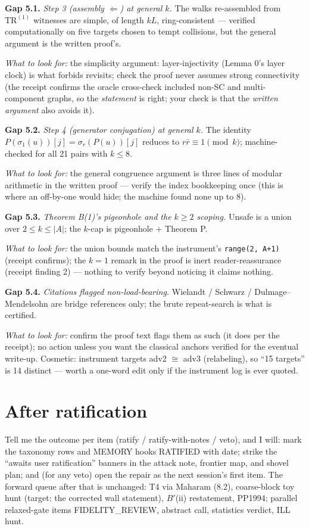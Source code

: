 \documentclass[11pt]{article}
\newcommand{\gap}[1]{\medskip\noindent\textbf{Gap #1.}}
\newcommand{\lookfor}{\par\smallskip\noindent\emph{What to look for:} }
\begin{document}
\gap{5.1} \emph{Step 3 (assembly $\Leftarrow$) at general $k$.} The
walks re-assembled from $\mathrm{TR}^{(1)}$ witnesses are simple, of
length $kL$, ring-consistent --- verified computationally on five
targets chosen to tempt collisions, but the general argument is the
written proof's.
\lookfor the simplicity argument: layer-injectivity (Lemma 0's layer
clock) is what forbids revisits; check the proof never assumes strong
connectivity (the receipt confirms the oracle cross-check included
non-SC and multi-component graphs, so the \emph{statement} is right;
your check is that the \emph{written argument} also avoids it).

\gap{5.2} \emph{Step 4 (generator conjugation) at general $k$.} The
identity $P(\sigma_1(u))[j] = \sigma_r(P(u))[j]$ reduces to $r \bar r
\equiv 1 \pmod k$; machine-checked for all 21 pairs with $k \le 8$.
\lookfor the general congruence argument is three lines of modular
arithmetic in the written proof --- verify the index bookkeeping once
(this is where an off-by-one would hide; the machine found none up to
8).

\gap{5.3} \emph{Theorem B(1)'s pigeonhole and the $k \ge 2$ scoping.}
Unsafe is a union over $2 \le k \le |A|$; the $k$-cap is pigeonhole
$+$ Theorem P.
\lookfor the union bounds match the instrument's
\texttt{range(2, A+1)} (receipt confirms); the $k = 1$ remark in the
proof is inert reader-reassurance (receipt finding 2) --- nothing to
verify beyond noticing it claims nothing.

\gap{5.4} \emph{Citations flagged non-load-bearing.} Wielandt /
Schwarz / Dulmage--Mendelsohn are bridge references only; the brute
repeat-search is what is certified.
\lookfor confirm the proof text flags them as such (it does per the
receipt); no action unless you want the classical anchors verified for
the eventual write-up. Cosmetic: instrument targets adv2 $\cong$ adv3
(relabeling), so ``15 targets'' is 14 distinct --- worth a one-word
edit only if the instrument log is ever quoted.

\section*{After ratification}

Tell me the outcome per item (ratify / ratify-with-notes / veto), and
I will: mark the taxonomy rows and MEMORY hooks RATIFIED with date;
strike the ``awaits user ratification'' banners in the attack note,
frontier map, and shovel plan; and (for any veto) open the repair as
the next session's first item. The forward queue after that is
unchanged: T4 via Maharam (8.2), coarse-block toy hunt (target: the
corrected wall statement), $B'$(ii) restatement, PP1994; parallel
relaxed-gate items FIDELITY\_REVIEW, abstract call, statistics
verdict, ILL hunt.
\end{document}
